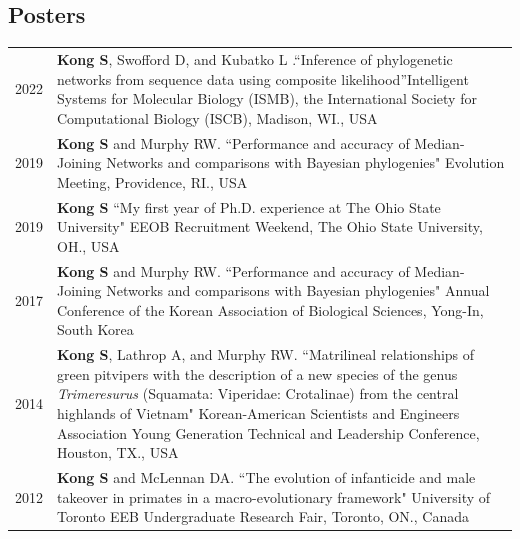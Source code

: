 \documentclass[11pt]{article}
\begin{document}
\subsection*{Posters}
\begin{longtable}{p{}  p{}}
2022 & {\color{black}{\textbf{[Best poster award winner]}}} \textbf{Kong S}, Swofford D, and Kubatko L .``Inference of phylogenetic networks from sequence data using composite likelihood''Intelligent Systems for Molecular Biology (ISMB), the International Society for Computational Biology (ISCB), Madison, WI., USA  \vspace{5pt}\\
2019 & \textbf{Kong S} and Murphy RW. ``Performance and accuracy of Median-Joining Networks and comparisons with Bayesian phylogenies" Evolution Meeting, Providence, RI., USA \vspace{5pt} \\ 
2019 &  \textbf{Kong S} ``My first year of Ph.D. experience at The Ohio State University" EEOB Recruitment Weekend,  The Ohio State University, OH., USA\vspace{5pt} \\ 
2017 & \textbf{Kong S} and Murphy RW. ``Performance and accuracy of Median-Joining Networks and comparisons with Bayesian phylogenies"  Annual Conference of the Korean Association of Biological Sciences, Yong-In, South Korea\vspace{5pt} \\ 
2014 & \textbf{Kong S}, Lathrop A, and Murphy RW. ``Matrilineal relationships of green pitvipers with the description of a new species of the genus \textit{Trimeresurus} (Squamata: Viperidae: Crotalinae) from the central highlands of Vietnam" Korean-American Scientists and Engineers Association Young Generation Technical and Leadership Conference, Houston, TX., USA\vspace{5pt} \\ 
2012 & \textbf{Kong S} and McLennan DA. ``The evolution of infanticide and male takeover in primates in a macro-evolutionary framework" University of Toronto EEB Undergraduate Research Fair, Toronto, ON., Canada\vspace{5pt}\\
\end{longtable}

\pagebreak
\end{document}
